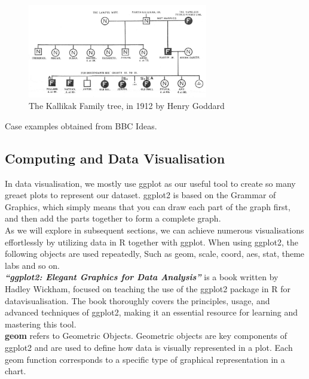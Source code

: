 \documentclass{article}\usepackage[]{graphicx}\usepackage[]{xcolor}
\begin{document}
\begin{figure}[H]
    \centering
    \includegraphics[width=0.7\textwidth]{familytree.jpg}
    \caption{The Kallikak Family tree, in 1912 by Henry Goddard\cite{ktree}}
    \label{fig:familytree}
\end{figure}

\noindent
Case examples obtained from BBC Ideas\cite{bbcdatavis}.

\subsection{Computing and Data Visualisation}

In data visualisation, we mostly use ggplot as our useful tool to create so many greaet plots to represent our dataset. ggplot2 is based on the Grammar of Graphics, which simply means that you can draw each part of the graph first, and then add the parts together to form a complete graph.\\

\noindent
As we will explore in subsequent sections, we can achieve numerous visualisations effortlessly by utilizing data in R together with ggplot.
When using ggplot2, the following objects are used repeatedly, Such as geom, scale, coord, aes, stat, theme labs and so on.\\

\noindent
\textbf{\textit{``ggplot2: Elegant Graphics for Data Analysis''}} is a book written by Hadley Wickham, focused on teaching the use of the ggplot2 package in R for datavisualisation. The book thoroughly covers the principles, usage, and advanced techniques of ggplot2, making it an essential resource for learning and mastering this tool.\\

\noindent
\textbf{geom} refers to Geometric Objects. Geometric objects are key components of ggplot2 and are used to define how data is visually represented in a plot. Each geom function corresponds to a specific type of graphical representation in a chart.\\
\end{document}

